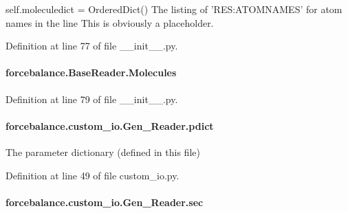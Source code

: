 self.\-moleculedict = Ordered\-Dict() The listing of 'R\-E\-S\-:A\-T\-O\-M\-N\-A\-M\-E\-S' for atom names in the line This is obviously a placeholder. 

Definition at line 77 of file \-\_\-\-\_\-init\-\_\-\-\_\-.\-py.

\hypertarget{classforcebalance_1_1BaseReader_a4369b5fb663a83b11602daa71db6862e}{
\paragraph[{Molecules}]{\setlength{\rightskip}{0pt plus 5cm}forcebalance.\-Base\-Reader.\-Molecules\hspace{0.3cm}{\ttfamily [inherited]}}}\label{classforcebalance_1_1BaseReader_a4369b5fb663a83b11602daa71db6862e}


Definition at line 79 of file \-\_\-\-\_\-init\-\_\-\-\_\-.\-py.

\hypertarget{classforcebalance_1_1custom__io_1_1Gen__Reader_a9beae2927c39b25cd569c4d2a3902c7d}{
\paragraph[{pdict}]{\setlength{\rightskip}{0pt plus 5cm}forcebalance.\-custom\-\_\-io.\-Gen\-\_\-\-Reader.\-pdict}}\label{classforcebalance_1_1custom__io_1_1Gen__Reader_a9beae2927c39b25cd569c4d2a3902c7d}


The parameter dictionary (defined in this file) 



Definition at line 49 of file custom\-\_\-io.\-py.

\hypertarget{classforcebalance_1_1custom__io_1_1Gen__Reader_ab6d68d48b38f27548edb3a4c3061f490}{
\paragraph[{sec}]{\setlength{\rightskip}{0pt plus 5cm}forcebalance.\-custom\-\_\-io.\-Gen\-\_\-\-Reader.\-sec}}\label{classforcebalance_1_1custom__io_1_1Gen__Reader_ab6d68d48b38f27548edb3a4c3061f490}


